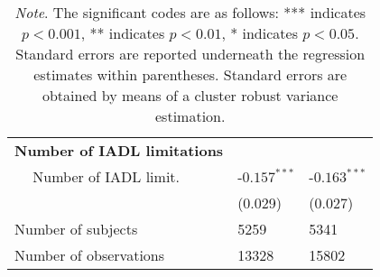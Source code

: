 \documentclass[12pt]{article}
\begin{document}
\begin{table}[htbp]
\begin{tabular}{ll ll}
\multicolumn{2}{l}{\textbf{Number of IADL limitations}}\\
& Number of IADL limit.    & -$0.157^{***}$ & -$0.163^{***}$   \\
&                                        &  (0.029)       &  (0.027)         \\
\multicolumn{2}{l}{Number of subjects}       &   5259         &  5341            \\
\multicolumn{2}{l}{Number of observations}   &   13328        &  15802           \\
\hline
\end{tabular}
\caption*{\footnotesize{\textit{Note}. The significant codes are as follows: *** indicates $p < 0.001$, ** indicates $p < 0.01$, * indicates $p <0.05$. Standard errors are reported underneath the regression estimates within parentheses. Standard errors are obtained by means of a cluster robust variance estimation.}}
\end{table}


\end{document}
